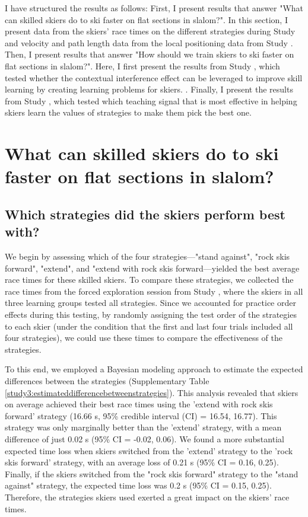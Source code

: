 I have structured the results as follows: First, I present results that answer "What can skilled skiers do to ski faster on flat sections in slalom?". In this section, I present data from the skiers' race times on the different strategies during Study  and velocity and path length data from the local positioning data from Study . Then, I present results that answer "How should we train skiers to ski faster on flat sections in slalom?". Here, I first present the results from Study , which tested whether the contextual interference effect can be leveraged to improve skill learning by creating learning problems for skiers.  . Finally, I present the results from Study , which tested which teaching signal that is most effective in helping skiers learn the values of strategies to make them pick the best one.  

\section{What can skilled skiers do to ski faster on flat sections in slalom?}


\subsection{Which strategies did the skiers perform best with?}
We begin by assessing which of the four strategies—"stand against", "rock skis forward", "extend", and "extend with rock skis forward—yielded the best average race times for these skilled skiers. To compare these strategies, we collected the race times from the forced exploration session from Study , where the skiers in all three learning groups tested all strategies. Since we accounted for practice order effects during this testing, by randomly assigning the test order of the strategies to each skier (under the condition that the first and last four trials included all four strategies), we could use these times to compare the effectiveness of the strategies. 

To this end, we employed a Bayesian modeling approach to estimate the expected differences between the strategies (Supplementary Table \ref{study3:estimateddifferencebetweenstrategies}). This analysis revealed that skiers on average achieved their best race times using the 'extend with rock skis forward' strategy (16.66 s, 95\% credible interval (CI) = 16.54, 16.77). This strategy was only marginally better than the 'extend' strategy, with a mean difference of just 0.02 s (95\% CI = -0.02, 0.06).  We found a more substantial expected time loss when skiers switched from the 'extend' strategy to the 'rock skis forward' strategy, with an average loss of 0.21 s (95\% CI = 0.16, 0.25). Finally, if the skiers switched from the "rock skis forward" strategy to the "stand against" strategy, the expected time loss was 0.2 s (95\% CI = 0.15, 0.25). Therefore, the strategies skiers used exerted a great impact on the skiers' race times. 

